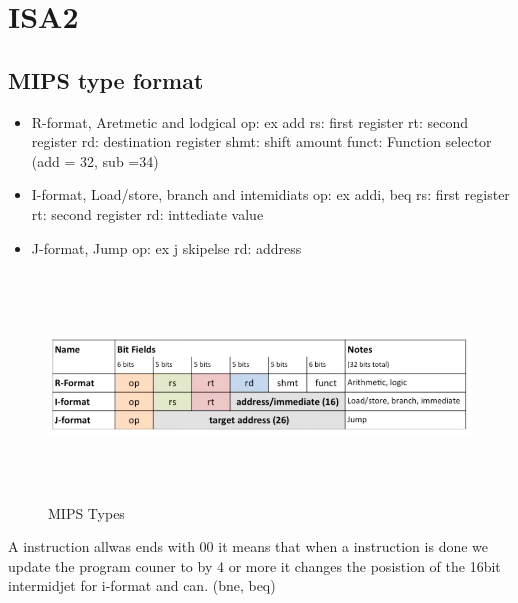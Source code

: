 \documentclass{article}
\begin{document}
\section{ISA2}
\subsection{MIPS type format}
\begin{itemize}
\item  R-format, Aretmetic and lodgical \newline
  op: ex add \newline
  rs: first register \newline
  rt: second register \newline
  rd: destination register \newline
  shmt: shift amount \newline
  funct: Function selector (add = 32, sub =34)
\item  I-format, Load/store, branch and intemidiats \newline 
  op: ex addi, beq \newline
  rs: first register \newline
  rt: second register \newline
  rd: inttediate value 
\item  J-format, Jump 
  op: ex j skipelse \newline
  rd: address   
\end{itemize}

\begin{figure}[h]
    \vspace{10mm}
    \centering
    \includegraphics[width=17cm, height=6cm]{image/mips-types.png} 
    \caption{MIPS Types}
\end{figure}

A instruction allwas ends with 00 it means that when a instruction is done we update the program couner
to by 4 or more it changes the posistion of the 16bit intermidjet for i-format and can. (bne, beq)
\end{document}
